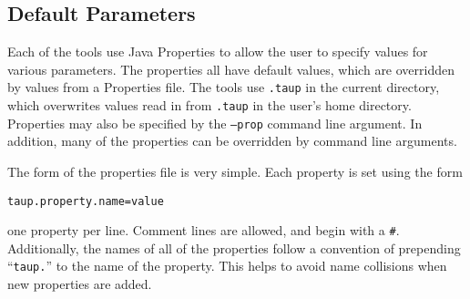 \subsection{Default Parameters} \label{properties}

Each of the tools use Java Properties to allow the user to specify values 
for various
parameters. The properties all have default values, which are overridden by
values from a Properties file. The tools use \texttt{.taup} in the 
current directory, which overwrites values read in from 
\texttt{.taup} in the user's home directory. Properties may also be specified by
the \texttt{--prop} command line argument.
In addition, many of the properties can be overridden by command line arguments.

The form of the properties file is very simple. Each property is set using
the form 
\begin{verbatim}
taup.property.name=value
\end{verbatim}
 one property per line.
Comment lines are allowed, and begin with a \texttt{\#}.
Additionally, the names of all of the properties follow a convention of
prepending ``\texttt{taup.}'' to the name of the property. 
This helps to avoid name collisions when new properties
are added.


